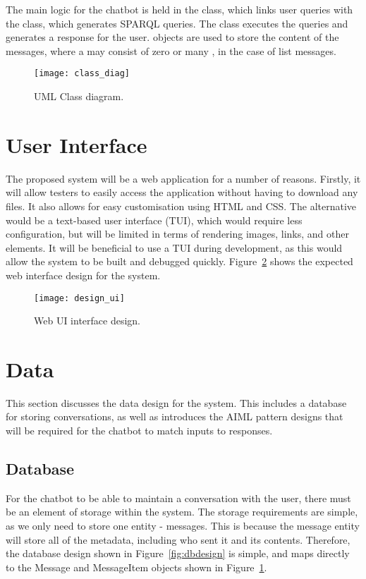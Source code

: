 The main logic for the chatbot is held in the  class, which links user queries with the  class, which generates SPARQL queries. The  class executes the queries and generates a response for the user.  objects are used to store the content of the messages, where a  may consist of zero or many , in the case of list messages.

\begin{figure}[h]
	\begin{center}
		\texttt{[image: class\_diag]}
	\end{center}
	\caption{UML Class diagram.}
	\label{fig:class_diagram}
\end{figure}

\newpage
\section{User Interface}
The proposed system will be a web application for a number of reasons. Firstly, it will allow testers to easily access the application without having to download any files. It also allows for easy customisation using HTML and CSS. The alternative would be a text-based user interface (TUI), which would require less configuration, but will be limited in terms of rendering images, links, and other elements. It will be beneficial to use a TUI during development, as this would allow the system to be built and debugged quickly. Figure~\ref{fig:design_ui} shows the expected web interface design for the system.

\begin{figure}[h]
	\begin{center}
		\texttt{[image: design\_ui]}
	\end{center}
	\caption{Web UI interface design.}
	\label{fig:design_ui}
\end{figure}

\section{Data}
This section discusses the data design for the system. This includes a database for storing conversations, as well as introduces the AIML pattern designs that will be required for the chatbot to match inputs to responses.

\subsection{Database}
For the chatbot to be able to maintain a conversation with the user, there must be an element of storage within the system. The storage requirements are simple, as we only need to store one entity - messages. This is because the message entity will store all of the metadata, including who sent it and its contents. Therefore, the database design shown in Figure~\ref{fig:dbdesign} is simple, and maps directly to the Message and MessageItem objects shown in Figure~\ref{fig:class_diagram}.

